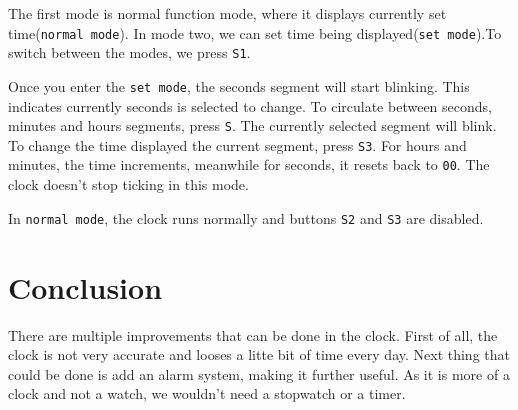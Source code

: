 \documentclass[journal]{IEEEtran}
\begin{document}
The first mode is normal function mode, where it displays currently set time(\texttt{normal mode}). In mode two, we can set time being displayed(\texttt{set mode}).To switch between the modes, we press \texttt{S1}. 

Once you enter the \texttt{set mode}, the seconds segment will start blinking. This indicates currently seconds is selected to change. To circulate between seconds, minutes and hours segments, press \texttt{S}. The currently selected segment will blink. To change the time displayed the current segment, press \texttt{S3}. For hours and minutes, the time increments, meanwhile for seconds, it resets back to \texttt{00}. The clock doesn't stop ticking in this mode.

In \texttt{normal mode}, the clock runs normally and buttons \texttt{S2} and \texttt{S3} are disabled.

\section{Conclusion}

There are multiple improvements that can be done in the clock. First of all, the clock is not very accurate and looses a litte bit of time every day. Next thing that could be done is add an alarm system, making it further useful. As it is more of a clock and not a watch, we wouldn't need a stopwatch or a timer.
\end{document}
